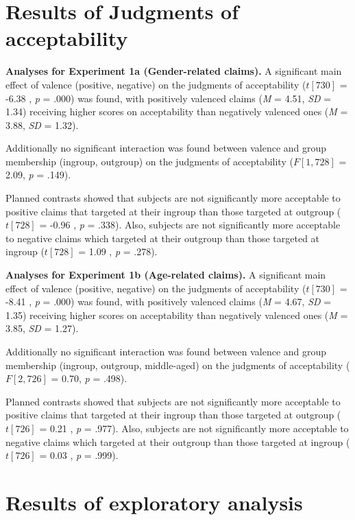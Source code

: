 \documentclass[man]{apa6}
\begin{document}
\section{Results of Judgments of
acceptability}\label{results-of-judgments-of-acceptability}

\textbf{Analyses for Experiment 1a (Gender-related claims).} A
significant main effect of valence (positive, negative) on the judgments
of acceptability (\(t [730]\) = -6.38 , \emph{p} = .000) was found, with
positively valenced claims (\emph{M} = 4.51, \emph{SD} = 1.34) receiving
higher scores on acceptability than negatively valenced ones (\emph{M} =
3.88, \emph{SD} = 1.32).

Additionally no significant interaction was found between valence and
group membership (ingroup, outgroup) on the judgments of acceptability
(\(F [1, 728]\) = 2.09, \emph{p} = .149).

Planned contrasts showed that subjects are not significantly more
acceptable to positive claims that targeted at their ingroup than those
targeted at outgroup (\(t [728]\) = -0.96 , \emph{p} = .338). Also,
subjects are not significantly more acceptable to negative claims which
targeted at their outgroup than those targeted at ingroup (\(t [728]\) =
1.09 , \emph{p} = .278).

\textbf{Analyses for Experiment 1b (Age-related claims).} A significant
main effect of valence (positive, negative) on the judgments of
acceptability (\(t [730]\) = -8.41 , \emph{p} = .000) was found, with
positively valenced claims (\emph{M} = 4.67, \emph{SD} = 1.35) receiving
higher scores on acceptability than negatively valenced ones (\emph{M} =
3.85, \emph{SD} = 1.27).

Additionally no significant interaction was found between valence and
group membership (ingroup, outgroup, middle-aged) on the judgments of
acceptability (\(F [2, 726]\) = 0.70, \emph{p} = .498).

Planned contrasts showed that subjects are not significantly more
acceptable to positive claims that targeted at their ingroup than those
targeted at outgroup (\(t [726]\) = 0.21 , \emph{p} = .977). Also,
subjects are not significantly more acceptable to negative claims which
targeted at their outgroup than those targeted at ingroup (\(t [726]\) =
0.03 , \emph{p} = .999).

\section{Results of exploratory
analysis}\label{results-of-exploratory-analysis}
\end{document}
